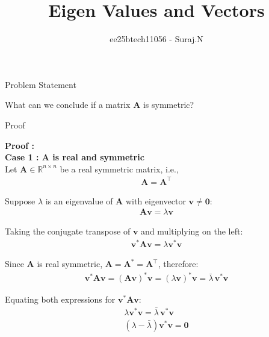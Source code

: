 \documentclass{beamer}
\title{Eigen Values and Vectors}
\author{ee25btech11056 - Suraj.N}
\numberwithin{equation}{section}
\theoremstyle{remark}
\let\vec\mathbf
\begin{document}
\begin{frame}
  \titlepage
\end{frame}

\begin{frame}{Problem Statement}

What can we conclude if a matrix $\vec{A}$ is symmetric?\\

\end{frame}

\begin{frame}{Proof}

\textbf{Proof :}\\

\textbf{Case 1 : $\vec{A}$ is real and symmetric}\\

Let $\vec{A} \in \mathbb{R}^{n \times n}$ be a real symmetric matrix, i.e.,
\begin{align}
\vec{A} = \vec{A}^\top
\end{align}

Suppose $\lambda$ is an eigenvalue of $\vec{A}$ with eigenvector $\vec{v} \ne \vec{0}$:
\begin{align}
\vec{A}\vec{v} = \lambda \vec{v}
\end{align}

Taking the conjugate transpose of $\vec{v}$ and multiplying on the left:
\begin{align}
\vec{v}^* \vec{A}\vec{v} = \lambda \vec{v}^* \vec{v}
\end{align}

Since $\vec{A}$ is real symmetric, $\vec{A} = \vec{A}^* = \vec{A}^\top$, therefore:
\begin{align}
\vec{v}^* \vec{A}\vec{v} = (\vec{A}\vec{v})^* \vec{v} = (\lambda \vec{v})^* \vec{v} = \bar{\lambda} \, \vec{v}^* \vec{v}
\end{align}

Equating both expressions for $\vec{v}^* \vec{A}\vec{v}$:
\begin{align}
\lambda \vec{v}^* \vec{v} = \bar{\lambda} \, \vec{v}^* \vec{v}\\
(\lambda- \bar{\lambda})\vec{v}^* \vec{v} = \vec{0}
\end{align}

\end{frame}
\end{document}
